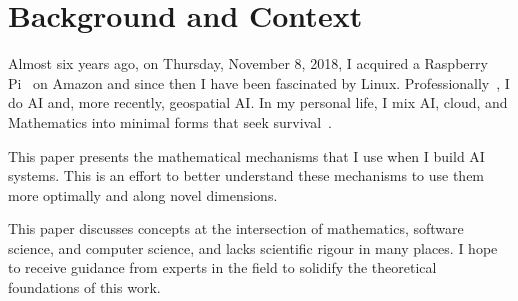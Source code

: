 \section{Background and Context}

Almost six years ago, on Thursday, November 8, 2018, I acquired a Raspberry Pi~\cite{rpi} on Amazon and since then I have been fascinated by Linux. Professionally~\cite{abadpour_com}, I do AI and, more recently, geospatial AI. In my personal life, I mix AI, cloud, and Mathematics into minimal forms that seek survival~\cite{kamangir_net}.

This paper presents the mathematical mechanisms that I use when I build AI systems. This is an effort to better understand these mechanisms to use them more optimally and along novel dimensions.

This paper discusses concepts at the intersection of mathematics, software science, and computer science, and lacks scientific rigour in many places. I hope to receive guidance from experts in the field to solidify the theoretical foundations of this work.